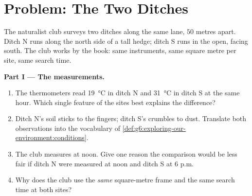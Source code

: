 \section{Problem: The Two Ditches}

\begin{problem}\label{pb:g6:exploring-our-environment:1}
The naturalist club surveys two ditches along the same lane,
$50$ metres apart. Ditch N runs along the north side of a
tall hedge; ditch S runs in the open, facing south. The club
works by the book: same instruments, same square metre per
site, same search time.

\medskip\noindent\textbf{Part I --- The measurements.}
\begin{enumerate}
  \item The thermometers read \qty{19}{\degreeCelsius} in
        ditch N and \qty{31}{\degreeCelsius} in ditch S at
        the same hour. Which single feature of the sites
        best explains the difference?
  \item Ditch N's soil sticks to the fingers; ditch S's
        crumbles to dust. Translate both observations into
        the vocabulary of
        \cref{def:g6:exploring-our-environment:conditions}.
  \item The club measures at noon. Give one reason the
        comparison would be less fair if ditch N were
        measured at noon and ditch S at 6 p.m.
  \item Why does the club use the \emph{same} square-metre
        frame and the same search time at both sites?
\end{enumerate}


\end{problem}
